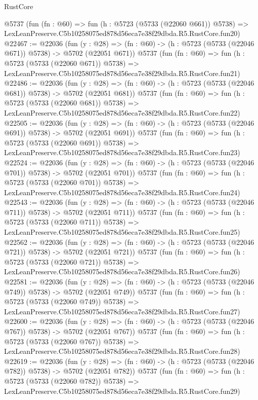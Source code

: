 \begin{lexlean}{RustCore}
\begin{coremodule}
    @5737
    (fun (fn : @60) =>
    fun (h : @5723 (@5733 (@22060 @661)) @5738) =>
    LexLeanPreserve.C5b10258075ed878d56eca7e38f29dbda.R5.RustCore.fun20)
@22467 := @22036
    (fun (y : @28) => (fn : @60) -> (h : @5723 (@5733 (@22046 @671)) @5738) -> @5702 (@22051 @671))
    @5737
    (fun (fn : @60) =>
    fun (h : @5723 (@5733 (@22060 @671)) @5738) =>
    LexLeanPreserve.C5b10258075ed878d56eca7e38f29dbda.R5.RustCore.fun21)
@22486 := @22036
    (fun (y : @28) => (fn : @60) -> (h : @5723 (@5733 (@22046 @681)) @5738) -> @5702 (@22051 @681))
    @5737
    (fun (fn : @60) =>
    fun (h : @5723 (@5733 (@22060 @681)) @5738) =>
    LexLeanPreserve.C5b10258075ed878d56eca7e38f29dbda.R5.RustCore.fun22)
@22505 := @22036
    (fun (y : @28) => (fn : @60) -> (h : @5723 (@5733 (@22046 @691)) @5738) -> @5702 (@22051 @691))
    @5737
    (fun (fn : @60) =>
    fun (h : @5723 (@5733 (@22060 @691)) @5738) =>
    LexLeanPreserve.C5b10258075ed878d56eca7e38f29dbda.R5.RustCore.fun23)
@22524 := @22036
    (fun (y : @28) => (fn : @60) -> (h : @5723 (@5733 (@22046 @701)) @5738) -> @5702 (@22051 @701))
    @5737
    (fun (fn : @60) =>
    fun (h : @5723 (@5733 (@22060 @701)) @5738) =>
    LexLeanPreserve.C5b10258075ed878d56eca7e38f29dbda.R5.RustCore.fun24)
@22543 := @22036
    (fun (y : @28) => (fn : @60) -> (h : @5723 (@5733 (@22046 @711)) @5738) -> @5702 (@22051 @711))
    @5737
    (fun (fn : @60) =>
    fun (h : @5723 (@5733 (@22060 @711)) @5738) =>
    LexLeanPreserve.C5b10258075ed878d56eca7e38f29dbda.R5.RustCore.fun25)
@22562 := @22036
    (fun (y : @28) => (fn : @60) -> (h : @5723 (@5733 (@22046 @721)) @5738) -> @5702 (@22051 @721))
    @5737
    (fun (fn : @60) =>
    fun (h : @5723 (@5733 (@22060 @721)) @5738) =>
    LexLeanPreserve.C5b10258075ed878d56eca7e38f29dbda.R5.RustCore.fun26)
@22581 := @22036
    (fun (y : @28) => (fn : @60) -> (h : @5723 (@5733 (@22046 @749)) @5738) -> @5702 (@22051 @749))
    @5737
    (fun (fn : @60) =>
    fun (h : @5723 (@5733 (@22060 @749)) @5738) =>
    LexLeanPreserve.C5b10258075ed878d56eca7e38f29dbda.R5.RustCore.fun27)
@22600 := @22036
    (fun (y : @28) => (fn : @60) -> (h : @5723 (@5733 (@22046 @767)) @5738) -> @5702 (@22051 @767))
    @5737
    (fun (fn : @60) =>
    fun (h : @5723 (@5733 (@22060 @767)) @5738) =>
    LexLeanPreserve.C5b10258075ed878d56eca7e38f29dbda.R5.RustCore.fun28)
@22619 := @22036
    (fun (y : @28) => (fn : @60) -> (h : @5723 (@5733 (@22046 @782)) @5738) -> @5702 (@22051 @782))
    @5737
    (fun (fn : @60) =>
    fun (h : @5723 (@5733 (@22060 @782)) @5738) =>
    LexLeanPreserve.C5b10258075ed878d56eca7e38f29dbda.R5.RustCore.fun29)

\end{coremodule}
\end{lexlean}
